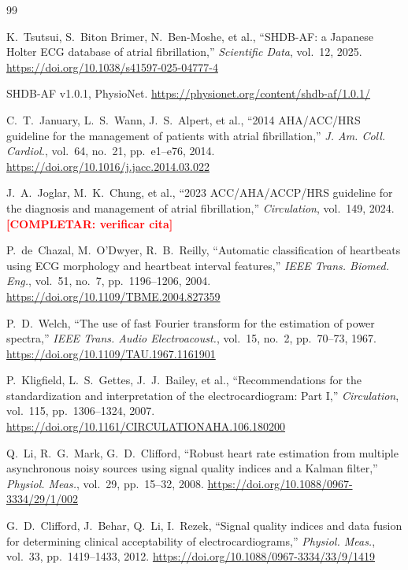 \documentclass[11pt,a4paper]{article}
\newcommand{\completar}[1]{\textcolor{red}{\textbf{[COMPLETAR: #1]}}}
\begin{document}
\begin{thebibliography}{99}

 K.~Tsutsui, S.~Biton Brimer, N.~Ben-Moshe, et al., ``SHDB-AF: a Japanese Holter ECG database of atrial fibrillation,'' \textit{Scientific Data}, vol.~12, 2025. \url{https://doi.org/10.1038/s41597-025-04777-4}

 SHDB-AF v1.0.1, PhysioNet. \url{https://physionet.org/content/shdb-af/1.0.1/}

 C.~T.~January, L.~S.~Wann, J.~S.~Alpert, et al., ``2014 AHA/ACC/HRS guideline for the management of patients with atrial fibrillation,'' \textit{J. Am. Coll. Cardiol.}, vol.~64, no.~21, pp.~e1--e76, 2014. \url{https://doi.org/10.1016/j.jacc.2014.03.022}

 J.~A.~Joglar, M.~K.~Chung, et al., ``2023 ACC/AHA/ACCP/HRS guideline for the diagnosis and management of atrial fibrillation,'' \textit{Circulation}, vol.~149, 2024. \completar{verificar cita}

 P.~de~Chazal, M.~O'Dwyer, R.~B.~Reilly, ``Automatic classification of heartbeats using ECG morphology and heartbeat interval features,'' \textit{IEEE Trans. Biomed. Eng.}, vol.~51, no.~7, pp.~1196--1206, 2004. \url{https://doi.org/10.1109/TBME.2004.827359}

 P.~D.~Welch, ``The use of fast Fourier transform for the estimation of power spectra,'' \textit{IEEE Trans. Audio Electroacoust.}, vol.~15, no.~2, pp.~70--73, 1967. \url{https://doi.org/10.1109/TAU.1967.1161901}

 P.~Kligfield, L.~S.~Gettes, J.~J.~Bailey, et al., ``Recommendations for the standardization and interpretation of the electrocardiogram: Part I,'' \textit{Circulation}, vol.~115, pp.~1306--1324, 2007. \url{https://doi.org/10.1161/CIRCULATIONAHA.106.180200}

 Q.~Li, R.~G.~Mark, G.~D.~Clifford, ``Robust heart rate estimation from multiple asynchronous noisy sources using signal quality indices and a Kalman filter,'' \textit{Physiol. Meas.}, vol.~29, pp.~15--32, 2008. \url{https://doi.org/10.1088/0967-3334/29/1/002}

 G.~D.~Clifford, J.~Behar, Q.~Li, I.~Rezek, ``Signal quality indices and data fusion for determining clinical acceptability of electrocardiograms,'' \textit{Physiol. Meas.}, vol.~33, pp.~1419--1433, 2012. \url{https://doi.org/10.1088/0967-3334/33/9/1419}


\end{thebibliography}
\end{document}
